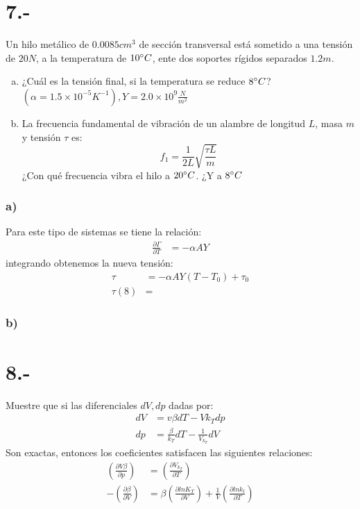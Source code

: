 \documentclass{article}
\begin{document}
\section*{7.-}
Un hilo metálico de $0.0085cm^3$ de sección transversal está sometido a una tensión de 
$20N$, a la temperatura de $10\degree C$, ente dos soportes rígidos separados $1.2m$. 
\begin{enumerate}[a)]
    \item ¿Cuál es la tensión final, si la temperatura se reduce $8\degree C$?
    $(\alpha = 1.5 \times 10^{-5}K^{-1}), Y = 2.0 \times 10^9 \frac{N}{m^2}$

    \item La frecuencia fundamental de vibración de un alambre de longitud $L$, 
    masa $m$ y tensión $\tau$ es:
    \[ f_1 = \frac{1}{2L} \sqrt{\frac{\tau L}{m}} \]
    ¿Con qué frecuencia vibra el hilo a $20\degree C$. ¿Y a $8\degree C$
\end{enumerate}
\begin{tcolorbox}[breakable]
    \subsubsection*{a)}
    Para este tipo de sistemas se tiene la relación:
    \begin{align*}
        \frac{\partial \Gamma}{\partial T} &= -\alpha A Y
    \end{align*}
    integrando obtenemos la nueva tensión:
    \begin{align*}
        \tau  &= -\alpha A Y (T-T_0) + \tau _0 \\ 
        \tau (8) &= 
    \end{align*}
    \subsubsection*{b)}
\end{tcolorbox}

\section*{8.-}
Muestre que si las diferenciales $dV, dp$ dadas por:
\begin{align*}
    dV &= v\beta dT - Vk_T dp \\
    dp &= \frac{\beta}{k_T} dT - \frac{1}{V_{k_T}}dV
\end{align*}
Son exactas, entonces los coeficientes satisfacen las siguientes relaciones:
\begin{align*}
    \left( \frac{\partial V\beta}{\partial p} \right)
    &=\left( \frac{\partial V_{k_T}}{\partial T} \right) \\
    - \left( \frac{\partial \beta}{\partial V} \right)
    &=\beta \left( \frac{\partial lnK_T}{\partial V} \right) 
    + \frac{1}{V}\left( \frac{\partial lnk_t}{\partial T} \right)
\end{align*}
\end{document}
